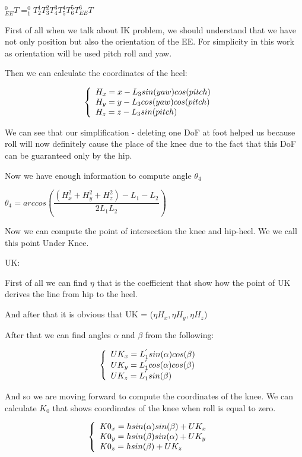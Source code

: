 \documentclass[12pt]{article}
\begin{document}
$^0_{EE}T = ^0_{1}T ^1_{2}T ^2_{3}T ^3_{4}T ^4_{5}T ^5_{6}T ^{6}_{EE}T$

\bigskip 

First of all when we talk about IK problem, we should understand that we have not only position but also the orientation of the EE. For simplicity in this work as orientation will be used pitch roll and yaw.

Then we can calculate the coordinates of the heel:

$$
	\left\{
	\begin{array}{l l}
		H_x = x - L_3 sin(yaw) cos(pitch) &\\
		H_y = y - L_3 cos(yaw) cos(pitch) &\\
		H_z = z - L_3 sin(pitch) & 
	\end{array}
	\right.
$$

We can see that our simplification - deleting one DoF at foot helped us because roll will now definitely  cause the place of the knee due to the fact that this DoF can be guaranteed only by the hip.

Now we have enough information to compute angle $\theta_4$

$\theta_4 = arccos \left( \dfrac{\left( H^2_x + H^2_y + H^2_z\right) - L_1 - L_2}{2 L_1 L_2} \right)$

Now we can compute the point of intersection the knee and hip-heel. We we call this point Under Knee.

UK:

First of all we can find $\eta$ that is the coefficient that show how the point of UK derives the line from hip to the heel.

And after that it is obvious that UK = ($\eta H_x, \eta H_y, \eta H_z$)

After that we can find angles $\alpha$ and $\beta$ from the following: 

$$
	\left\{
	\begin{array}{l l}
		UK_x = L^{'}_1 sin(\alpha) cos(\beta) &\\
		UK_y = L^{'}_1 cos(\alpha) cos(\beta) &\\
		UK_z = L^{'}_1 sin(\beta) & 
	\end{array}
	\right.
$$

And so we are moving forward to compute the coordinates of the knee. We can calculate $K_0$ that shows coordinates of the knee when roll is equal to zero.

$$
	\left\{
	\begin{array}{l l}
		K0_x = h sin(\alpha) sin(\beta) + UK_x &\\
		K0_y = h sin(\beta) sin(\alpha) + UK_y &\\
		K0_z = h sin(\beta) + UK_z& 
	\end{array}
	\right.
$$
\end{document}
